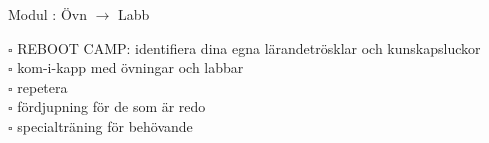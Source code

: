 
Modul : Övn  $\rightarrow$ Labb 
\begin{multicols}{3}\SlideFontTiny
$\square$ REBOOT CAMP: identifiera dina egna lärandetrösklar och kunskapsluckor \\
$\square$ kom-i-kapp med övningar och labbar \\
$\square$ repetera \\
$\square$ fördjupning för de som är redo \\
$\square$ specialträning för behövande \\     
\end{multicols}
